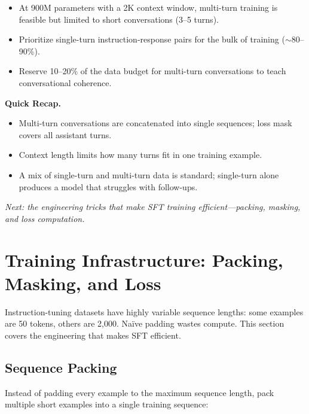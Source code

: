 \begin{tcolorbox}[colback=orange!5, colframe=orange!60, title=\textbf{For Project~3: Multi-Turn Data Budget}]
\begin{itemize}[nosep]
  \item At 900M parameters with a 2K context window, multi-turn training is feasible but limited to short conversations (3--5 turns).
  \item Prioritize single-turn instruction-response pairs for the bulk of training ($\sim$80--90\%).
  \item Reserve 10--20\% of the data budget for multi-turn conversations to teach conversational coherence.
\end{itemize}
\end{tcolorbox}

\begin{quickrecap}
\textbf{Quick Recap.}
\begin{itemize}[nosep,leftmargin=1.5em]
  \item Multi-turn conversations are concatenated into single sequences; loss mask covers all assistant turns.
  \item Context length limits how many turns fit in one training example.
  \item A mix of single-turn and multi-turn data is standard; single-turn alone produces a model that struggles with follow-ups.
\end{itemize}
\textit{Next: the engineering tricks that make SFT training efficient---packing, masking, and loss computation.}
\end{quickrecap}


\section{Training Infrastructure: Packing, Masking, and Loss}
\label{sec:sft-infrastructure}

Instruction-tuning datasets have highly variable sequence lengths: some examples are 50 tokens, others are 2{,}000. Na\"ive padding wastes compute. This section covers the engineering that makes SFT efficient.

\subsection{Sequence Packing}

Instead of padding every example to the maximum sequence length, pack multiple short examples into a single training sequence:

